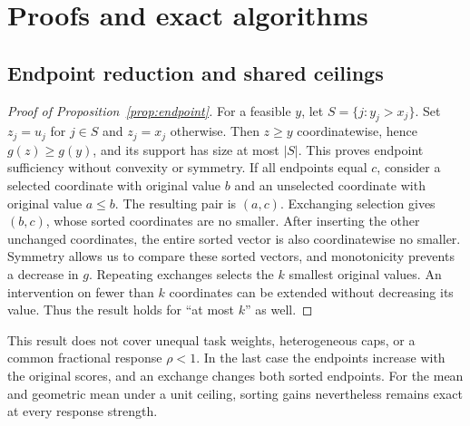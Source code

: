 \documentclass{article}
\begin{document}



\clearpage
\appendix
\section{Proofs and exact algorithms}
\label{app:proofs}
\subsection{Endpoint reduction and shared ceilings}
\begin{proof}[Proof of Proposition~\ref{prop:endpoint}]
For a feasible $y$, let $S=\{j:y_j>x_j\}$. Set $z_j=u_j$ for $j\in S$ and
$z_j=x_j$ otherwise. Then $z\ge y$ coordinatewise, hence $g(z)\ge g(y)$, and its
support has size at most $|S|$. This proves endpoint sufficiency without convexity
or symmetry. If all endpoints equal $c$, consider a selected coordinate with
original value $b$ and an unselected coordinate with original value $a\le b$.
The resulting pair is $(a,c)$. Exchanging selection gives $(b,c)$, whose sorted
coordinates are no smaller. After inserting the other unchanged coordinates,
the entire sorted vector is also coordinatewise no smaller. Symmetry allows us
to compare these sorted vectors, and monotonicity prevents a decrease in $g$.
Repeating exchanges selects the $k$ smallest original values. An intervention on
fewer than $k$ coordinates can be extended without decreasing its value. Thus
the result holds for ``at most $k$'' as well.
\end{proof}

This result does not cover unequal task weights, heterogeneous caps, or a common
fractional response $\rho<1$. In the last case the endpoints increase with the
original scores, and an exchange changes both sorted endpoints. For the mean and
geometric mean under a unit ceiling, sorting gains nevertheless remains exact
at every response strength.
\end{document}
